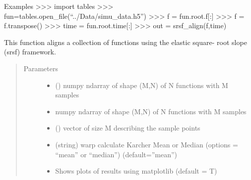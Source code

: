 \documentclass[letterpaper,10pt,english]{sphinxmanual}
\begin{document}
\begin{fulllineitems}
Examples
\textgreater{}\textgreater{}\textgreater{} import tables
\textgreater{}\textgreater{}\textgreater{} fun=tables.open\_file(“../Data/simu\_data.h5”)
\textgreater{}\textgreater{}\textgreater{} f = fun.root.f{[}:{]}
\textgreater{}\textgreater{}\textgreater{} f = f.transpose()
\textgreater{}\textgreater{}\textgreater{} time = fun.root.time{[}:{]}
\textgreater{}\textgreater{}\textgreater{} out = srsf\_align(f,time)

\end{fulllineitems}


\begin{fulllineitems}
\label{\detokenize{time_warping:time_warping.srsf_align_pair}}
This function aligns a collection of functions using the elastic square-
root slope (srsf) framework.
\begin{quote}\begin{description}
\item[{Parameters}] \leavevmode\begin{itemize}
\item {} 
 () \textendash{} numpy ndarray of shape (M,N) of N functions with M samples

\item {} 
 \textendash{} numpy ndarray of shape (M,N) of N functions with M samples

\item {} 
 () \textendash{} vector of size M describing the sample points

\item {} 
 \textendash{} (string) warp calculate Karcher Mean or Median (options =
“mean” or “median”) (default=”mean”)

\item {} 
 \textendash{} Shows plots of results using matplotlib (default = T)


\end{itemize}
\end{description}
\end{quote}
\end{fulllineitems}
\end{document}
